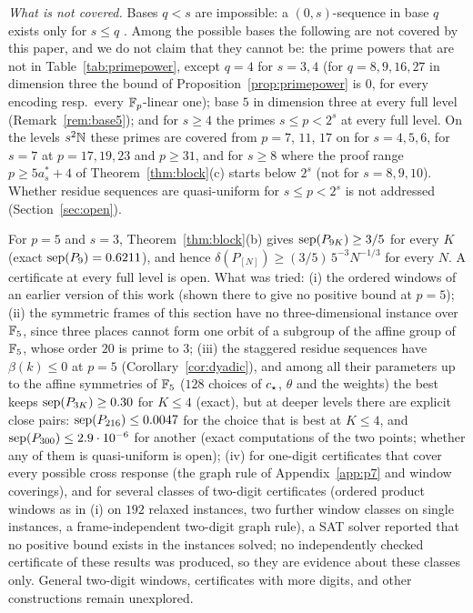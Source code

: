 \emph{What is not covered.} Bases $q<s$ are impossible: a $(0,s)$-sequence in base $q$ exists only for $s\le q$ \cite{Nie92}. Among the possible bases the following are not covered by this paper, and we do not claim that they cannot be: the prime powers that are not in Table~\ref{tab:primepower}, except $q=4$ for $s=3,4$ (for $q=8,9,16,27$ in dimension three the bound of Proposition~\ref{prop:primepower} is $0$, for every encoding resp.\ every $\mathbb{F}_p$-linear one); base $5$ in dimension three at every full level (Remark~\ref{rem:base5}); and for $s\ge4$ the primes $s\le p<2^s$ at every full level. On the levels $s^2\mathbb{N}$ these primes are covered from $p=7$, $11$, $17$ on for $s=4,5,6$, for $s=7$ at $p=17,19,23$ and $p\ge31$, and for $s\ge8$ where the proof range $p\ge5a^*_s+4$ of Theorem~\ref{thm:block}(c) starts below $2^s$ (not for $s=8,9,10$). Whether residue sequences are quasi-uniform for $s\le p<2^s$ is not addressed (Section~\ref{sec:open}).

\begin{remark}\label{rem:base5}
For $p=5$ and $s=3$, Theorem~\ref{thm:block}(b) gives $\operatorname{sep}(P_{9K})\ge3/5$ for every $K$ (exact $\operatorname{sep}(P_9)=0.6211$), and hence $\delta(P_{[N]})\ge(3/5)\,5^{-3}N^{-1/3}$ for every $N$. A certificate at every full level is open. What was tried: (i) the ordered windows of an earlier version of this work (shown there to give no positive bound at $p=5$); (ii) the symmetric frames of this section have no three-dimensional instance over $\mathbb{F}_5$, since three places cannot form one orbit of a subgroup of the affine group of $\mathbb{F}_5$, whose order $20$ is prime to $3$; (iii) the staggered residue sequences have $\beta(k)\le0$ at $p=5$ (Corollary~\ref{cor:dyadic}), and among all their parameters up to the affine symmetries of $\mathbb{F}_5$ ($128$ choices of $c_{\star}$, $\theta$ and the weights) the best keeps $\operatorname{sep}(P_{3K})\ge0.30$ for $K\le4$ (exact), but at deeper levels there are explicit close pairs: $\operatorname{sep}(P_{216})\le0.0047$ for the choice that is best at $K\le4$, and $\operatorname{sep}(P_{300})\le2.9\cdot10^{-6}$ for another (exact computations of the two points; whether any of them is quasi-uniform is open); (iv) for one-digit certificates that cover every possible cross response (the graph rule of Appendix~\ref{app:p7} and window coverings), and for several classes of two-digit certificates (ordered product windows as in (i) on $192$ relaxed instances, two further window classes on single instances, a frame-independent two-digit graph rule), a SAT solver reported that no positive bound exists in the instances solved; no independently checked certificate of these results was produced, so they are evidence about these classes only. General two-digit windows, certificates with more digits, and other constructions remain unexplored.
\end{remark}
